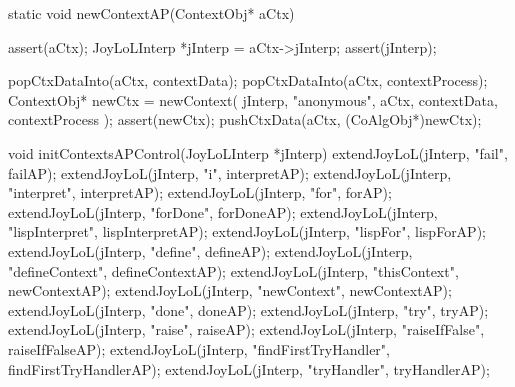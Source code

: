 \startCCode
static void newContextAP(ContextObj* aCtx) {
  assert(aCtx);
  JoyLoLInterp *jInterp = aCtx->jInterp;
  assert(jInterp);
  
  popCtxDataInto(aCtx, contextData);
  popCtxDataInto(aCtx, contextProcess);
  ContextObj* newCtx = newContext(
    jInterp,
    "anonymous",
    aCtx,
    contextData,
    contextProcess
  );
  assert(newCtx);
  pushCtxData(aCtx, (CoAlgObj*)newCtx);
}
\stopCCode

\startCCode
void initContextsAPControl(JoyLoLInterp *jInterp) {
  extendJoyLoL(jInterp, "fail",                failAP);
  extendJoyLoL(jInterp, "i",                   interpretAP);
  extendJoyLoL(jInterp, "interpret",           interpretAP);
  extendJoyLoL(jInterp, "for",                 forAP);
  extendJoyLoL(jInterp, "forDone",             forDoneAP);
  extendJoyLoL(jInterp, "lispInterpret",       lispInterpretAP);
  extendJoyLoL(jInterp, "lispFor",             lispForAP);
  extendJoyLoL(jInterp, "define",              defineAP);
  extendJoyLoL(jInterp, "defineContext",       defineContextAP);
  extendJoyLoL(jInterp, "thisContext",         newContextAP);
  extendJoyLoL(jInterp, "newContext",          newContextAP);
  extendJoyLoL(jInterp, "done",                doneAP);
  extendJoyLoL(jInterp, "try",                 tryAP);
  extendJoyLoL(jInterp, "raise",               raiseAP);
  extendJoyLoL(jInterp, "raiseIfFalse",        raiseIfFalseAP);
  extendJoyLoL(jInterp, "findFirstTryHandler", findFirstTryHandlerAP);
  extendJoyLoL(jInterp, "tryHandler",          tryHandlerAP);
}
\stopCCode